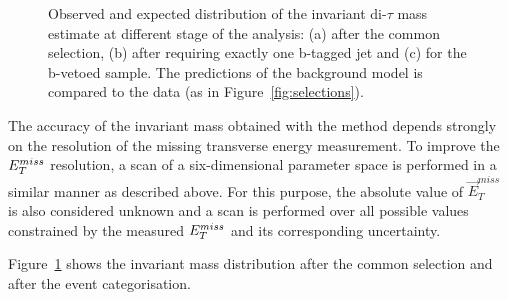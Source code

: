 \begin{figure}[p]
\begin{center}
{            %
     }	

    \end{center}
     	

    \caption{Observed and expected distribution of the 	invariant di-$\tau$ mass estimate \mmc at
	 different stage of the analysis: (a) after the common selection,
	(b) after requiring exactly one b-tagged jet and (c) for the b-vetoed sample.	The predictions 
	of the  background model is compared to  the data (as in Figure~\ref{fig:selections}).}
   \label{fig:mass}
\end{figure}


The accuracy of the  invariant mass obtained with the \mmc method depends strongly on the 
resolution of the missing transverse energy measurement.
To improve the $E_{T}^{miss}$ resolution, a scan of a six-dimensional parameter space is performed 
in a similar manner as described above. For this purpose, the absolute value of $\vec{E}_T^{miss}$ is also considered unknown and a scan 
is performed over all possible values constrained by the measured $E_{T}^{miss}$ and its corresponding uncertainty.
%

Figure~\ref{fig:mass} shows the  \mmc invariant mass distribution after the common selection and after the 
event categorisation.

 


